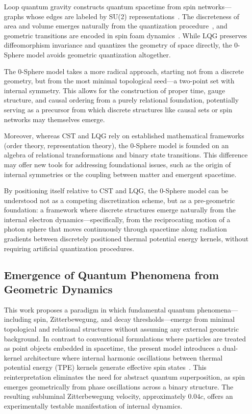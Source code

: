 \documentclass[%
 reprint,
 amsmath,amssymb,
 aps,
]{revtex4-1}
\numberwithin{equation}{section}%
\begin{document}
Loop quantum gravity constructs quantum spacetime from spin networks—graphs whose edges are labeled by SU(2) representations~\cite{rovelli2004, baez1994}. The discreteness of area and volume emerges naturally from the quantization procedure~\cite{rovelli1995}, and geometric transitions are encoded in spin foam dynamics~\cite{freidel2005}. While LQG preserves diffeomorphism invariance and quantizes the geometry of space directly, the 0-Sphere model avoids geometric quantization altogether.

The 0-Sphere model takes a more radical approach, starting not from a discrete geometry, but from the most minimal topological seed—a two-point set with internal symmetry. This allows for the construction of proper time, gauge structure, and causal ordering from a purely relational foundation, potentially serving as a precursor from which discrete structures like causal sets or spin networks may themselves emerge.

Moreover, whereas CST and LQG rely on established mathematical frameworks (order theory, representation theory), the 0-Sphere model is founded on an algebra of relational transformations and binary state transitions. This difference may offer new tools for addressing foundational issues, such as the origin of internal symmetries or the coupling between matter and emergent spacetime.

By positioning itself relative to CST and LQG, the 0-Sphere model can be understood not as a competing discretization scheme, but as a pre-geometric foundation: a framework where discrete structures emerge naturally from the internal electron dynamics—specifically, from the reciprocating motion of a photon sphere that moves continuously through spacetime along radiation gradients between discretely positioned thermal potential energy kernels, without requiring artificial quantization procedures.


\subsection{Emergence of Quantum Phenomena from Geometric Dynamics}
\label{subsec:quantum_emergence}

This work proposes a paradigm in which fundamental quantum phenomena—including spin, Zitterbewegung, and decay thresholds—emerge from minimal topological and relational structures without assuming any external geometric background. In contrast to conventional formulations where particles are treated as point objects embedded in spacetime, the present model introduces a dual-kernel architecture where internal harmonic oscillations between thermal potential energy (TPE) kernels generate effective spin states~\cite{hanamura2309.0047}. This reinterpretation eliminates the need for abstract quantum superposition, as spin emerges geometrically from phase oscillations across a binary structure. The resulting subluminal Zitterbewegung velocity, approximately $0.04c$, offers an experimentally testable manifestation of internal dynamics.
\end{document}
